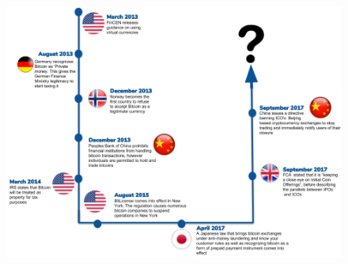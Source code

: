 \documentclass[10pt]{beamer}
\begin{document}
\begin{frame}{}
	\begin{figure}[]
		\centering
		\includegraphics  [scale=0.3]{Images/reg-timeline}
	\end{figure}
\end{frame}

\end{document}
